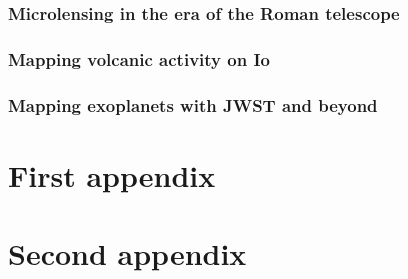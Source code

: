 \documentclass[11pt]{report}
\begin{document}
\subsection{Microlensing in the era of the Roman telescope}
\subsection{Mapping volcanic activity on Io}
\subsection{Mapping exoplanets with JWST and beyond}

\appendix

\chapter{First appendix}
\label{app:complex_poly}

\chapter{Second appendix}


\end{document}
